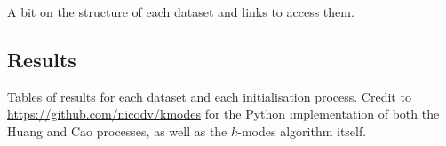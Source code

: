 A bit on the structure of each dataset and links to access them.


\subsection{Results}\label{subsec:results}

Tables of results for each dataset and each initialisation process. Credit to 
\url{https://github.com/nicodv/kmodes} for the Python implementation of both the
Huang and Cao processes, as well as the $k$-modes algorithm itself.

\begin{example}
\begin{figure}
    \resizebox{\textwidth}{!}{%
    \centering
    
}
\end{figure}
\end{example}
